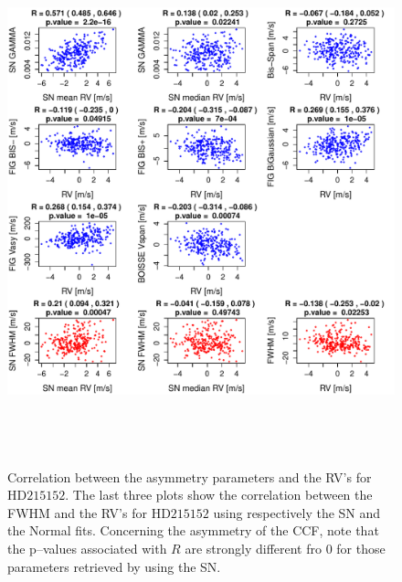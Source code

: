 \documentclass[11pt, oneside]{article}
\begin{document}
\begin{figure}[htbp]
   \centering
\includegraphics[height = 6in]{HD21515_[4]Comparison_para.pdf}  
   \caption{Correlation between the asymmetry parameters and the RV's for $\text{HD}215152$. The last three plots show the correlation between the FWHM and the RV's for $\text{HD}215152$ using respectively the SN and the Normal fits. Concerning the asymmetry of the CCF, note that the p--values associated with $R$ are strongly different fro $0$ for those parameters retrieved by using the SN.}
   \label{fig:HD215152:corrPlot}
\end{figure}
\end{document}
